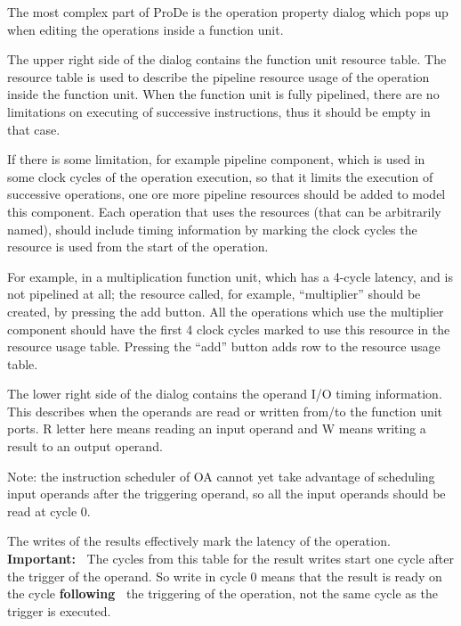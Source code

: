 \documentclass[a4paper,twoside]{tceusermanual}
\begin{document}
The most complex part of ProDe is the operation property dialog which pops
up when editing the operations inside a function unit.


The upper right side of the dialog contains the function unit resource table.
The resource table is used to describe the pipeline resource usage of the
operation inside the function unit.
When the function unit is fully pipelined, there are no limitations on
executing of successive instructions, thus it should be empty in that case.

If there is some limitation, for example pipeline component, which is used in 
some clock cycles of the operation execution, so that it limits the execution of 
successive operations, one ore more pipeline resources should be added to model 
this component. Each operation that uses the resources (that can be arbitrarily
named), should include timing information by marking the clock cycles the resource
is used from the start of the operation.

For example, in a multiplication function unit, which has a 4-cycle latency,
and is not pipelined at all; the resource called, for example, ``multiplier'' 
should be created, by pressing the add button. All the operations which use the 
multiplier component should have the first 4 clock cycles marked to use this 
resource in the resource usage table. Pressing the ``add'' button adds row to 
the resource usage table.

The lower right side of the dialog contains the operand I/O timing information.
This describes when the operands are read or written from/to the function unit
ports. R letter here means reading an input operand and W means writing a result to 
an output operand.

Note: the instruction scheduler of OA cannot yet take advantage of scheduling 
input operands after the triggering operand, so all the input operands should be 
read at cycle 0.


The writes of the results effectively mark the latency of the operation.
\textbf{Important:\ }
The cycles from this table for the result writes start one cycle after the
trigger of the operand. So write in cycle 0 means that the result is ready
on the cycle \textbf{following\ } the triggering of the operation, 
not the same cycle as the trigger is executed.
\end{document}
